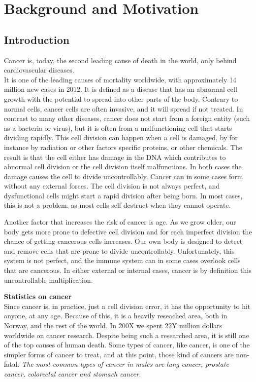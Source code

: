 \section{Background and Motivation}

\subsection{Introduction}
Cancer is, today, the second leading cause of death in the world, only behind cardiovascular diseases.\\  %
It is one of the leading causes of mortality worldwide, with approximately 14 million new cases in 2012. %
It is defined as a disease that has an abnormal cell growth with the potential to spread into other parts of the body.%
Contrary to normal cells, cancer cells are often invasive, and it will spread if not treated. 
In contrast to many other diseases, cancer does not start from a foreign entity (such as a bacteria or virus), but it is often from a malfunctioning cell that starts dividing rapidly. 
This cell division can happen when a cell is damaged, by for instance by radiation or other factors specific proteins, or other chemicals. The result is that the cell either has damage in the DNA which contributes to abnormal cell division or the cell division itself malfunctions. In both cases the damage causes the cell to divide uncontrollably. 
Cancer can in some cases form without any external forces. The cell division is not always perfect, and dysfunctional cells might start a rapid division after being born. In most cases, this is not a problem, as most cells self destruct when they cannot operate. 

Another factor that increases the risk of cancer is age. As we grow older, our body gets more prone to defective cell division and for each imperfect division the chance of getting cancerous cells increases.  
Our own body is designed to detect and remove cells that are prone to divide uncontrollably. Unfortunately, this system is not perfect, and the immune system can in some cases overlook cells that are cancerous.
In either external or internal cases, cancer is by definition this uncontrollable multiplication.




\textbf{Statistics on cancer}\\
Since cancer is, in practice, just a cell division error, it has the opportunity to hit anyone, at any age. Because of this, it is a heavily reseached area, both in Norway, and the rest of the world.
In 200X we spent 22Y million dollars worldwide on cancer research. 
Despite being such a researched area, it is still one of the top causes of human death. 
Some types of cancer, like \todo{} cancer, is one of the simpler forms of cancer to treat, and at this point, those kind of cancers are non-fatal. 
\textit{The most common types of cancer in males are lung cancer, prostate cancer, colorectal cancer and stomach cancer.\cite{stewart2014world}}
    

